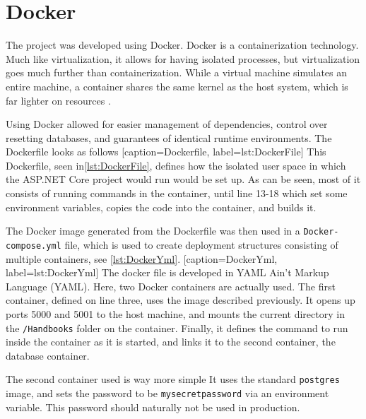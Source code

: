 \section{Docker}
The project was developed using Docker.
Docker is a containerization technology.
Much like virtualization, it allows for having isolated processes, but virtualization goes much further than containerization.
While a virtual machine simulates an entire machine, a container shares the same kernel as the host system, which is far lighter on resources \cite{docker}.

Using Docker allowed for easier management of dependencies, control over resetting databases, and guarantees of identical runtime environments.
The Dockerfile looks as follows
[caption={Dockerfile}, label={lst:DockerFile}]
This Dockerfile, seen in\cref{lst:DockerFile}, defines how the isolated user space in which the ASP.NET Core project would run would be set up.
As can be seen, most of it consists of running commands in the container, until line 13-18 which set some environment variables, copies the code into the container, and builds it.

The Docker image generated from the Dockerfile was then used in a \texttt{Docker-compose.yml} file, which is used to create deployment structures consisting of multiple containers, see \cref{lst:DockerYml}.
[caption={DockerYml}, label={lst:DockerYml}]
The docker file is developed in YAML Ain't Markup Language (YAML).
Here, two Docker containers are actually used.
The first container, defined on line three, uses the image described previously.
It opens up ports 5000 and 5001 to the host machine, and mounts the current directory in the \texttt{/Handbooks} folder on the container.
Finally, it defines the command to run inside the container as it is started, and links it to the second container, the database container.

The second container used is way more simple
It uses the standard \texttt{postgres} image, and sets the password to be \texttt{mysecretpassword} via an environment variable.
This password should naturally not be used in production.
